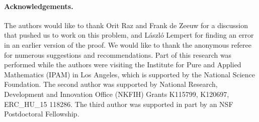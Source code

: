 \documentclass[letterpaper, reqno,11pt]{article}
\theoremstyle{remark}
\begin{document}
%
%
%
\paragraph{Acknowledgements.}
The authors would like to thank Orit Raz and Frank de Zeeuw for a
discussion that pushed us to work on this problem, and L\'aszl\'o Lempert
for finding an error in an earlier version of the proof.
We would like to thank the anonymous referee for numerous suggestions and recommendations. Part of this research was performed while the authors were visiting the Institute for Pure and Applied Mathematics (IPAM) in Los Angeles, which is supported by the National Science Foundation. The second author was supported by National Research, Development and Innovation Office (NKFIH) Grants K115799, K120697, ERC\_HU\_15 118286. 
The third author was supported in part by an NSF Postdoctoral Fellowship.



\end{document}
